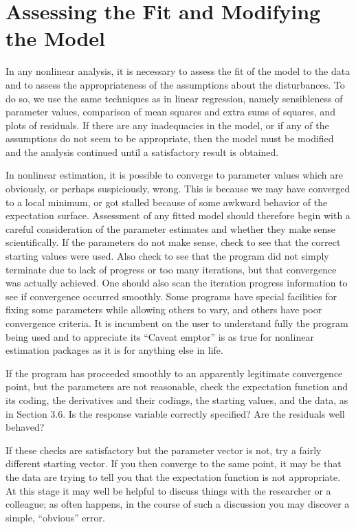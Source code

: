 \section{Assessing the Fit and Modifying the Model}

In any nonlinear analysis, it is necessary to assess the fit of
the model to the data and to assess the appropriateness of the
assumptions about the disturbances.
To do so, we use the same techniques as in linear regression,
namely sensibleness of parameter values, comparison of mean
squares and extra sums of squares, and plots of residuals.
If there are any inadequacies in the model, or if any of the
assumptions do not seem to be appropriate, then the model must be
modified and the analysis continued until a satisfactory result
is obtained.

In nonlinear estimation, it is possible to converge to parameter
values which are obviously, or perhaps suspiciously, wrong.
This is because we may have converged to a local minimum, or got
stalled because of some awkward behavior of the expectation
surface.
Assessment of any fitted model should therefore begin with a
careful consideration of the parameter estimates and whether they
make sense scientifically.
If the parameters do not make sense, check to see that the
correct starting values were used.
Also check to see that
the program did not simply terminate due to lack of progress or
too many iterations, but
that convergence was actually achieved.
One should also scan the iteration progress information to see if
convergence occurred smoothly.
Some programs have special facilities for fixing some parameters
while allowing others to vary, and others have poor convergence
criteria.
It is incumbent on the user to understand fully the program being
used and to appreciate its ``Caveat emptor''
is as true for nonlinear estimation packages as
it is for anything else in life.

If the program has proceeded smoothly to an apparently
legitimate convergence point, but the parameters are not
reasonable, check the expectation function and its coding, the derivatives
and their codings, the starting values, and the data, as in
Section 3.6.
Is the response variable correctly specified?
Are the residuals well behaved?

If these checks are satisfactory but the parameter vector is not,
try a fairly different starting vector.
If you then converge to the same point, it may be that the data
are trying to tell you that the expectation function is not
appropriate.
At this stage it may well be helpful to discuss things with the
researcher or a colleague;  as
often happens, in the course of such a discussion you may
discover a simple, ``obvious'' error.

